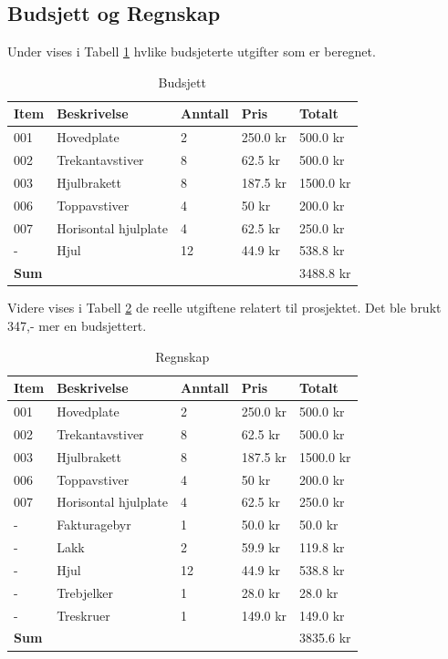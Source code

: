 \subsection{Budsjett og Regnskap}
Under vises i Tabell \ref{TBL1} hvlike budsjeterte utgifter som er beregnet.
\begin{table}[H]
\begin{tabular}{l l l l l}
 \textbf{Item} & \textbf{Beskrivelse} & \textbf{Anntall} & \textbf{Pris} & \textbf{Totalt}  \\
\hline
001&Hovedplate&2&250.0 kr&500.0 kr\\
002&Trekantavstiver&8&62.5 kr&500.0 kr\\
003&Hjulbrakett&8&187.5 kr& 1500.0 kr\\
006&Toppavstiver&4&50 kr& 200.0 kr\\
007&Horisontal hjulplate&4&62.5 kr& 250.0 kr\\
-&Hjul&12&44.9 kr& 538.8 kr\\
\hline
\textbf{Sum}&&&&3488.8 kr\\
\hline
\end{tabular}
\caption{Budsjett}
\label{TBL1}
\end{table}
Videre vises i Tabell \ref{TBL2} de reelle utgiftene relatert til prosjektet. Det ble brukt 347,- mer en budsjettert. 
\begin{table}[H]
\begin{tabular}{l l l l l}
 \textbf{Item} & \textbf{Beskrivelse} & \textbf{Anntall} & \textbf{Pris} & \textbf{Totalt}  \\
\hline
001&Hovedplate&2&250.0 kr&500.0 kr\\
002&Trekantavstiver&8&62.5 kr&500.0 kr\\
003&Hjulbrakett&8&187.5 kr& 1500.0 kr\\
006&Toppavstiver&4&50 kr& 200.0 kr\\
007&Horisontal hjulplate&4&62.5 kr& 250.0 kr\\
-&Fakturagebyr&1&50.0 kr&50.0 kr\\
-&Lakk&2&59.9 kr&119.8 kr\\
-&Hjul&12&44.9 kr& 538.8 kr\\
-&Trebjelker&1&28.0 kr&28.0 kr\\
-&Treskruer&1&149.0 kr&149.0 kr\\
\hline
\textbf{Sum}&&&&3835.6 kr\\
\hline
\end{tabular}
\caption{Regnskap}
\label{TBL2}
\end{table}
